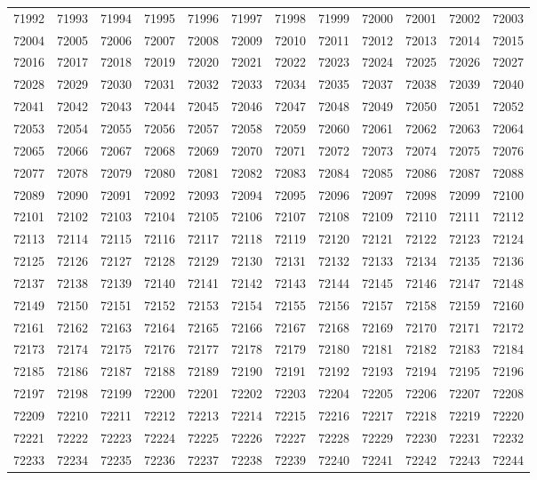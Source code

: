 \begin{center}
\begin{longtable}{llllllllllll}
71992 &71993 &71994 &71995 &71996 &71997 &71998 &71999 &72000 &72001 &72002 &72003 \\
72004 &72005 &72006 &72007 &72008 &72009 &72010 &72011 &72012 &72013 &72014 &72015 \\
72016 &72017 &72018 &72019 &72020 &72021 &72022 &72023 &72024 &72025 &72026 &72027 \\
72028 &72029 &72030 &72031 &72032 &72033 &72034 &72035 &72037 &72038 &72039 &72040 \\
72041 &72042 &72043 &72044 &72045 &72046 &72047 &72048 &72049 &72050 &72051 &72052 \\
72053 &72054 &72055 &72056 &72057 &72058 &72059 &72060 &72061 &72062 &72063 &72064 \\
72065 &72066 &72067 &72068 &72069 &72070 &72071 &72072 &72073 &72074 &72075 &72076 \\
72077 &72078 &72079 &72080 &72081 &72082 &72083 &72084 &72085 &72086 &72087 &72088 \\
72089 &72090 &72091 &72092 &72093 &72094 &72095 &72096 &72097 &72098 &72099 &72100 \\
72101 &72102 &72103 &72104 &72105 &72106 &72107 &72108 &72109 &72110 &72111 &72112 \\
72113 &72114 &72115 &72116 &72117 &72118 &72119 &72120 &72121 &72122 &72123 &72124 \\
72125 &72126 &72127 &72128 &72129 &72130 &72131 &72132 &72133 &72134 &72135 &72136 \\
72137 &72138 &72139 &72140 &72141 &72142 &72143 &72144 &72145 &72146 &72147 &72148 \\
72149 &72150 &72151 &72152 &72153 &72154 &72155 &72156 &72157 &72158 &72159 &72160 \\
72161 &72162 &72163 &72164 &72165 &72166 &72167 &72168 &72169 &72170 &72171 &72172 \\
72173 &72174 &72175 &72176 &72177 &72178 &72179 &72180 &72181 &72182 &72183 &72184 \\
72185 &72186 &72187 &72188 &72189 &72190 &72191 &72192 &72193 &72194 &72195 &72196 \\
72197 &72198 &72199 &72200 &72201 &72202 &72203 &72204 &72205 &72206 &72207 &72208 \\
72209 &72210 &72211 &72212 &72213 &72214 &72215 &72216 &72217 &72218 &72219 &72220 \\
72221 &72222 &72223 &72224 &72225 &72226 &72227 &72228 &72229 &72230 &72231 &72232 \\
72233 &72234 &72235 &72236 &72237 &72238 &72239 &72240 &72241 &72242 &72243 &72244 \\

\end{longtable}
\end{center}

